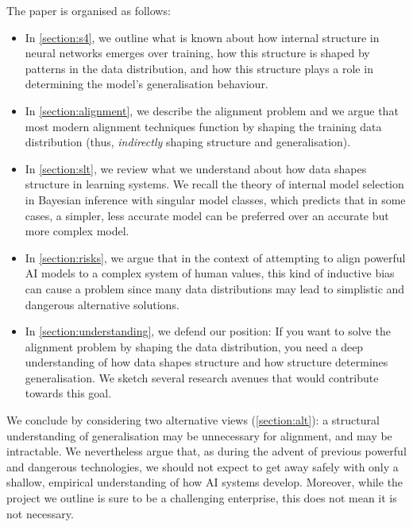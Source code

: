The paper is organised as follows:
\begin{itemize}
    \item
        In \cref{section:s4}, we outline what is known about how internal structure in neural networks emerges over training, how this structure is shaped by patterns in the data distribution, and how this structure plays a role in determining the model's generalisation behaviour.
    \item 
        In \cref{section:alignment}, we describe the alignment problem\footnotemark{} and we argue that most modern alignment techniques function by shaping the training data distribution (thus, \emph{indirectly} shaping structure and generalisation).
    \item 
        In \cref{section:slt}, we review what we understand about how data shapes structure in learning systems. We recall the theory of internal model selection in Bayesian inference with singular model classes, which predicts that in some cases, a simpler, less accurate model can be preferred over an accurate but more complex model.
    \item
        In \cref{section:risks}, we argue that in the context of attempting to align powerful AI models to a complex system of human values, this kind of inductive bias can cause a problem since many data distributions may lead to simplistic and dangerous alternative solutions.
    \item 
        In \cref{section:understanding}, we defend our position: If you want to solve the alignment problem by shaping the data distribution, you need a deep understanding of how data shapes structure and how structure determines generalisation. We sketch several research avenues that would contribute towards this goal.
\end{itemize}
We conclude by considering two alternative views (\cref{section:alt}): a structural understanding of generalisation may be unnecessary for alignment, and may be intractable. We nevertheless argue that, as during the advent of previous powerful and dangerous technologies, we should not expect to get away safely with only a shallow, empirical understanding of how AI systems develop. Moreover, while the project we outline is sure to be a challenging enterprise, this does not mean it is not necessary.


